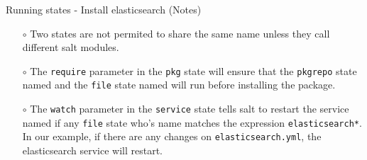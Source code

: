 \documentclass[dvipsnames]{beamer}
\begin{document}
\begin{frame}[fragile]{Running states - Install elasticsearch (Notes)}
\begin{itemize}
\item[$\circ$] Two states are not permited to share the same name unless they call 
different salt modules.
\pause
\item [$\circ$] The \texttt{require} parameter in the \texttt{pkg} state will ensure that the  
\texttt{pkgrepo} state named  and the \texttt{file} state named 
 will run before installing the  package.
\pause
\item [$\circ$] The \texttt{watch} parameter in the \texttt{service} state 
tells salt to restart the service named  if any \texttt{file} 
state who's name matches the expression 
\texttt{elasticsearch*}. In our example, if there are any changes on 
\texttt{elasticsearch.yml}, the elasticsearch service will restart.
\end{itemize}
\end{frame}
\end{document}
